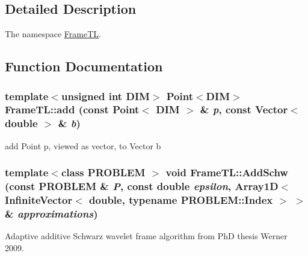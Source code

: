 \subsection{Detailed Description}
The namespace \hyperlink{namespaceFrameTL}{FrameTL}. 



\subsection{Function Documentation}
\hypertarget{namespaceFrameTL_fd9af4210f87f330a600bdba74ca3f6d}{
\subsubsection[{add}]{\setlength{\rightskip}{0pt plus 5cm}template$<$unsigned int DIM$>$ Point$<$DIM$>$ FrameTL::add (const Point$<$ DIM $>$ \& {\em p}, \/  const Vector$<$ double $>$ \& {\em b})}}
\label{namespaceFrameTL_fd9af4210f87f330a600bdba74ca3f6d}


add Point p, viewed as vector, to Vector b \hypertarget{namespaceFrameTL_fae0f5be715e2324d15ca01a18665855}{
\subsubsection[{AddSchw}]{\setlength{\rightskip}{0pt plus 5cm}template$<$class PROBLEM $>$ void FrameTL::AddSchw (const PROBLEM \& {\em P}, \/  const double {\em epsilon}, \/  Array1D$<$ InfiniteVector$<$ double, typename PROBLEM::Index $>$ $>$ \& {\em approximations})}}
\label{namespaceFrameTL_fae0f5be715e2324d15ca01a18665855}


Adaptive additive Schwarz wavelet frame algorithm from PhD thesis Werner 2009. 

